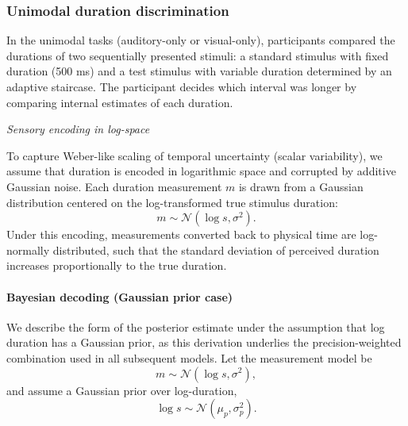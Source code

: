 \documentclass{biorxiv}
\begin{document}
\subsubsection{Unimodal duration discrimination}

In the unimodal tasks (auditory-only or visual-only), participants compared the durations of two sequentially presented stimuli: a standard stimulus with fixed duration (500 ms) and a test stimulus with variable duration determined by an adaptive staircase. The participant decides which interval was longer by comparing internal estimates of each duration.


\textit{Sensory encoding in log-space}

To capture Weber-like scaling of temporal uncertainty (scalar variability), we assume that duration is encoded in logarithmic space and corrupted by additive Gaussian noise. Each duration measurement $m$ is drawn from a Gaussian distribution centered on the log-transformed true stimulus duration:
\begin{equation}
m \sim \mathcal{N}(\log s, \sigma^2).
\end{equation}
Under this encoding, measurements converted back to physical time are log-normally distributed, such that the standard deviation of perceived duration increases proportionally to the true duration.


\paragraph{Bayesian decoding (Gaussian prior case)}

We describe the form of the posterior estimate under the assumption that log duration has a Gaussian prior, as this derivation underlies the precision-weighted combination used in all subsequent models. 
Let the measurement model be
\begin{equation}
m \sim \mathcal{N}(\log s, \sigma^2),
\label{eq:likelihood}
\end{equation}
and assume a Gaussian prior over log-duration,
\begin{equation}
\log s \sim \mathcal{N}(\mu_p, \sigma_p^2).
\label{eq:prior}
\end{equation}
\end{document}
